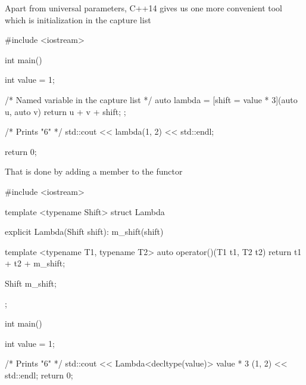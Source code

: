 \documentclass[../main]{subfiles}
\begin{document}
    Apart from universal parameters, C++14 gives us one more convenient tool which is initialization in the capture list
\begin{Code}
    #include <iostream>
    
    int main()
    {
        int value = 1;
        
        /* Named variable in the capture list */
        auto lambda = [shift = value * 3](auto u, auto v)
        {
            return u + v + shift;
        };
        
        /* Prints "6" */
        std::cout << lambda(1, 2) << std::endl;
    
        return 0;
    }
\end{Code}
\noindent
That is done by adding a member to the functor
\begin{Code}
    #include <iostream>
    
    template <typename Shift>
    struct Lambda
    {
        explicit Lambda(Shift shift):
            m_shift(shift)
        {
        }
        
        template <typename T1, typename T2>
        auto operator()(T1 t1, T2 t2)
        {
            return t1 + t2 + m_shift;
        }
        
        Shift m_shift;
    };
    
    int main()
    {
        int value = 1;
        
        /* Prints "6" */
        std::cout << Lambda<decltype(value)> { value * 3 } (1, 2)
                  << std::endl;
        return 0;
    }
\end{Code}
\end{document}

